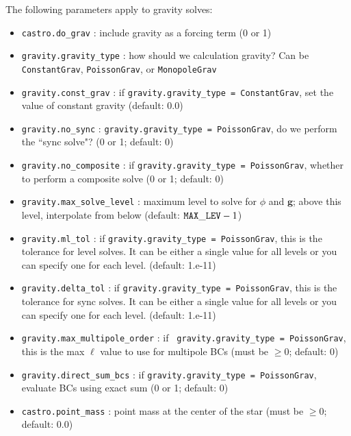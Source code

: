 The following parameters apply to gravity
solves:
\begin{itemize}

\item {\tt castro.do\_grav} : include gravity as a forcing term (0 or 1)

\item {\tt gravity.gravity\_type} : how should we calculation gravity?
  Can be {\tt ConstantGrav}, {\tt PoissonGrav}, or {\tt MonopoleGrav}

\item {\tt gravity.const\_grav} : if {\tt gravity.gravity\_type =
  ConstantGrav}, set the value of constant gravity (default: 0.0)

\item {\tt gravity.no\_sync} : {\tt gravity.gravity\_type = PoissonGrav},
 do we perform the ``sync solve"? (0 or 1; default: 0)

\item {\tt gravity.no\_composite} : if {\tt gravity.gravity\_type =
  PoissonGrav}, whether to perform a composite solve (0 or 1; default:
  0)

\item {\tt gravity.max\_solve\_level} : maximum level to solve for
  $\phi$ and $\mathbf{g}$; above this level, interpolate from below
  (default: ${\tt MAX\_LEV} - 1$)

\item {\tt gravity.ml\_tol} : if {\tt gravity.gravity\_type =
  PoissonGrav}, this is the tolerance for level solves.  It can be
  either a single value for all levels or you can specify one for each
  level. (default: 1.e-11)

\item {\tt gravity.delta\_tol} : if {\tt gravity.gravity\_type =
  PoissonGrav}, this is the tolerance for sync solves. It can be
  either a single value for all levels or you can specify one for each
  level.  (default: 1.e-11)

\item {\tt gravity.max\_multipole\_order} : if {\tt
  gravity.gravity\_type = PoissonGrav}, this is the max $\ell$ value
  to use for multipole BCs (must be $\geq 0$; default: 0)

\item {\tt gravity.direct\_sum\_bcs} : if {\tt gravity.gravity\_type =
  PoissonGrav}, evaluate BCs using exact sum (0 or 1; default: 0)

\item {\tt castro.point\_mass} : point mass at the center of the
 star (must be $\geq 0$; default: 0.0)
\end{itemize}

